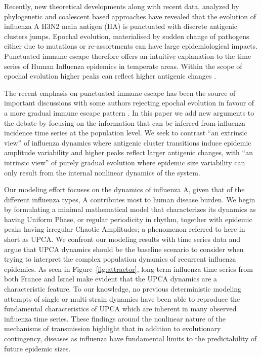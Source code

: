Recently, new theoretical developments along with recent data,
analyzed by phylogenetic and coalescent based approaches
\citep{Smith2004, Koelle2006, Wolf2006, Rambaut2008} have revealed
that the evolution of influenza A H3N2 main antigen (HA) is punctuated
with discrete antigenic clusters jumps. Epochal evolution,
materialised by sudden change of pathogens either due to mutations or
re-assortments can have large epidemiological impacts. Punctuated
immune escape therefore offers an intuitive explanation to the time
series of Human Influenza epidemics in temperate areas. Within the
scope of epochal evolution higher peaks can reflect higher antigenic
changes \citep{Koelle2006}.

The recent emphasis on punctuated immune escape has been the source of
important discussions with some authors rejecting epochal evolution in
favour of a more gradual immune escape pattern \citep{Shih2007,
  Suzuki2008, Ballesteros2009}. In this paper we add new arguments to
the debate by focusing on the information that can be inferred from
influenza incidence time series at the population level.  We seek to
contrast ``an extrinsic view'' \citep{Cobey2008} of influenza dynamics
where antigenic cluster transitions induce epidemic amplitude
variability and higher peaks reflect larger antigenic changes, with
``an intrinsic view'' of purely gradual evolution where epidemic size
variability can only result from the internal nonlinear dynamics of
the system.

Our modeling effort focuses on the dynamics of influenza A, given that
of the different influenza types, A contributes most to human disease
burden.  We begin by formulating a minimal mathematical model that
characterizes its dynamics as having Uniform Phase, or regular
periodicity in rhythm, together with epidemic peaks having irregular
Chaotic Amplitudes; a phenomenon referred to here in short as UPCA.
We confront our modeling results with time series data and argue that
UPCA dynamics should be the baseline scenario to consider when trying
to interpret the complex population dynamics of recurrent influenza
epidemics.  As seen in Figure~\ref{fig:attractor}, long-term influenza
time series from both France and Israel make evident that the UPCA
dynamics are a characteristic feature.  To our knowledge, no previous
deterministic modeling attempts of single or multi-strain dynamics
have been able to reproduce the fundamental characteristics of UPCA
which are inherent in many observed influenza time series.  These
findings around the nonlinear nature of the mechanisms of transmission
highlight that in addition to evolutionary contingency, diseases as
influenza have fundamental limits to the predictability of future
epidemic sizes.



